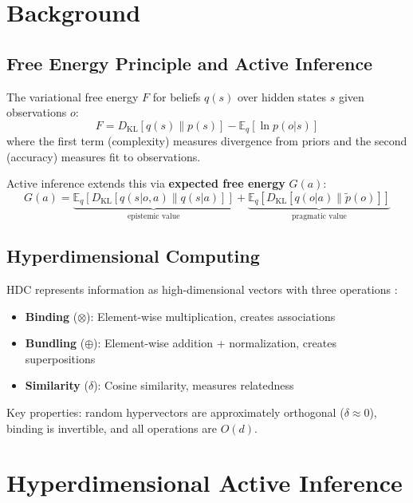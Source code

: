 \documentclass{article}
\begin{document}
\section{Background}

\subsection{Free Energy Principle and Active Inference}

The variational free energy $F$ for beliefs $q(s)$ over hidden states $s$ given observations $o$:
\begin{equation}
F = D_{\text{KL}}[q(s) \| p(s)] - \mathbb{E}_q[\ln p(o|s)]
\end{equation}
where the first term (complexity) measures divergence from priors and the second (accuracy) measures fit to observations.

Active inference extends this via \textbf{expected free energy} $G(a)$:
\begin{equation}
G(a) = \underbrace{\mathbb{E}_{q}[D_{\text{KL}}[q(s|o,a) \| q(s|a)]]}_{\text{epistemic value}} + \underbrace{\mathbb{E}_{q}[D_{\text{KL}}[q(o|a) \| \tilde{p}(o)]]}_{\text{pragmatic value}}
\end{equation}

\subsection{Hyperdimensional Computing}

HDC represents information as high-dimensional vectors with three operations \citep{kanerva2009hyperdimensional}:
\begin{itemize}
    \item \textbf{Binding} ($\otimes$): Element-wise multiplication, creates associations
    \item \textbf{Bundling} ($\oplus$): Element-wise addition + normalization, creates superpositions
    \item \textbf{Similarity} ($\delta$): Cosine similarity, measures relatedness
\end{itemize}

Key properties: random hypervectors are approximately orthogonal ($\delta \approx 0$), binding is invertible, and all operations are $O(d)$.

\section{Hyperdimensional Active Inference}
\end{document}
